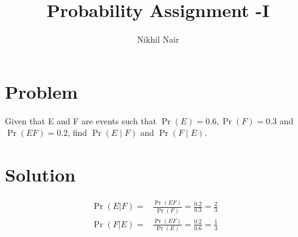 \documentclass[journal,12pt,twocolumn]{IEEEtran}
\title{\mytitle}
\title{
Probability Assignment -I
}
\author{Nikhil Nair}
\begin{document}
\maketitle
\bigskip


\section{\textbf{Problem }}
Given that E and F are events such that $\Pr{(E)}=0.6, \Pr{(F)}=0.3$ and $\Pr{(E F)}=0.2$, find $\Pr{(E \mid F)}$ and $\Pr{(F \mid E)}$.



\section{\textbf{Solution }}

\begin{align}
\Pr{(E|F)}=&\frac{\Pr{(E  F)}}{\Pr{(F)}}=\frac{0.2}{0.3}=\frac{2}{3}&  
\\
\Pr{(F|E)}=&\frac{\Pr{(E  F)}}{\Pr{(E)}}=\frac{0.2}{0.6}=\frac{1}{3}&  
\end{align}
\end{document}
